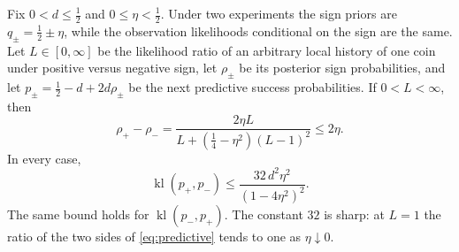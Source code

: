 \begin{lemma}\label{lem:posterior}
Fix $0<d\le\tfrac12$ and $0\le\eta<\tfrac12$. Under two experiments the sign priors are
$q_\pm=\tfrac12\pm\eta$, while the observation likelihoods conditional on the sign are the
same. Let $L\in[0,\infty]$ be the likelihood ratio of an arbitrary local history of one
coin under positive versus negative sign, let $\rho_\pm$ be its posterior sign
probabilities, and let $p_\pm=\tfrac12-d+2d\rho_\pm$ be the next predictive success
probabilities. If $0<L<\infty$, then
\begin{equation}\label{eq:posterior}
\rho_+-\rho_-=\frac{2\eta L}{L+(\tfrac14-\eta^2)(L-1)^2}\le2\eta .
\end{equation}
In every case,
\begin{equation}\label{eq:predictive}
\operatorname{kl}(p_+,p_-)\le\frac{32\,d^2\eta^2}{(1-4\eta^2)^2}.
\end{equation}
The same bound holds for $\operatorname{kl}(p_-,p_+)$. The constant $32$ is sharp: at $L=1$ the ratio of the two sides of
\eqref{eq:predictive} tends to one as $\eta\downarrow0$.
\end{lemma}

